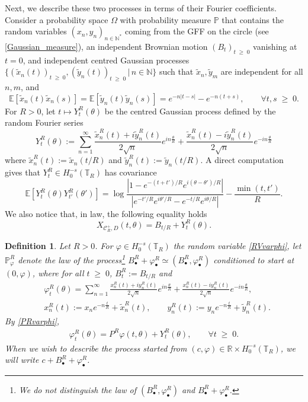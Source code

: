 \documentclass[11pt]{amsart}
\numberwithin{equation}{section}
\newtheorem{definition}[theorem]{Definition}
\theoremstyle{definition}
\renewcommand{\tilde}{\widetilde}          %
\renewcommand{\geq}{\;\geqslant\;}                   %
\def\E{\mathbb{E}}
\newcommand{\mc}{\mathcal}
\def\T{\mathbb{T}}
\begin{document}
Next, we describe these two processes in terms of their Fourier coefficients. 
Consider a probability space $\Omega$ with probability measure $\mathbb{P}$ that contains the random variables $(x_n, y_n)_{n \in \mathbb{N}^\ast}$ coming from the GFF on the circle (see \eqref{Gaussian_measure}), an independent Brownian motion $(B_t)_{t \geq 0}$ vanishing at $t=0$, and independent centred Gaussian processes$\{ (\tilde{x}_n(t))_{t \geq 0},(\tilde{y}_n(t))_{t \geq 0} \,|\,  n \in \mathbb{N}\}$ such that $\tilde{x}_n, \tilde{y}_m$ are independent for all $n,m$, and 
\[
\E[\tilde{x}_n (t) \tilde{x}_n (s) ]= \E[\tilde{y}_n (t) \tilde{y}_n (s) ]=  e^{- n  |t-s|}-e^{-n (t+s)}, \qquad \forall t,s \geq 0. 
\]
For $R>0$, let $t \mapsto Y_t^R(\theta)$ be the centred Gaussian process defined by the random Fourier series
\begin{equation}\label{DefY_t}
Y_t^R(\theta):=\sum_{n=1}^\infty\frac{\tilde{x}^R_n(t)+i\tilde{y}^R_n(t)}{2\sqrt{n}}e^{in\frac{\theta}{R}}+\frac{\tilde{x}^R_n(t)-i\tilde{y}^R_n(t)}{2\sqrt{n}}e^{-in\frac{\theta}{R}}
\end{equation} 
where $\tilde{x}_n^R(t):=\tilde{x}_n(t/R)$ and $\tilde{y}_n^R(t):=\tilde{y}_n(t/R)$.
A direct computation gives that $Y_t^R\in H^{-s}_0(\T_R)$ has covariance  
\begin{equation}\label{cov_YR}
\E [ Y_t^R(\theta) Y_{t'}^R(\theta') ] = \log \frac{|1- e^{-(t+t')/R} e^{i (\theta-\theta')/R}|}{|e^{-t'/R} e^{i \theta'/R}- e^{-t/R} e^{i \theta/R} |}- \frac{\min(t,t')}R.
\end{equation} 
We also notice that, in law, the following equality holds
\[X_{\mc{C}_R^+,D}(t,\theta)=B_{t/R}+Y_t^R(\theta).\] 
\begin{definition} \label{def: Markov process}
Let $R>0$. For $\varphi \in H^{-s}_0(\mathbb{T}_R)$ the random variable \eqref{RVvarphi}, let $\mathbb{P}^R_\varphi$ denote the law of the process\footnote{We do not distinguish the law of $(B_\bullet^R, \varphi_\bullet^R)$ and $B_\bullet^R+\varphi_\bullet^R$.} $B^R_\bullet + \varphi^R_\bullet \simeq (B^R_\bullet, \varphi^R_\bullet)$ conditioned to start at $(0,\varphi)$, where for all $t \geq 0$, $B^R_t := B_{t/R}$ and
\begin{align}
 & \varphi^R_t(\theta)=\sum_{n=1}^\infty \frac{x_n^R(t)+iy_n^R(t)}{2\sqrt{n}}
e^{in \frac{\theta}{R}}+\frac{x_n^R(t)-iy_n^R(t)}{2\sqrt{n}}
e^{-in \frac{\theta}{R}},\\
& x^R_n(t):=x_n e^{-n \frac{t}{R}}+ \tilde{x}^R_n(t), \qquad y^R_n(t):=y_n e^{-n \frac{t}{R}}+ \tilde{y}^R_n(t).
\end{align}
By \eqref{PRvarphi},   
\begin{align}\label{varphit_def}
\varphi^R_t(\theta)
=
P^R\varphi(t,\theta) + Y_t^R(\theta), \qquad \forall t \geq 0.
\end{align}
When we wish to describe the process started from $(c,\varphi) \in \mathbb{R}\times H^{-s}_0(\mathbb{T}_R)$, we will write $c+B^R_\bullet + \varphi^R_\bullet$. 
\end{definition}
\end{document}
